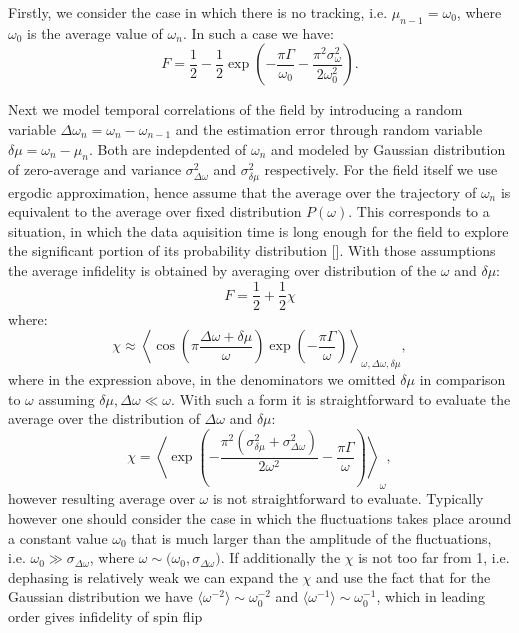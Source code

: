\documentclass[aps,twocolumn,pra,notitlepage,]{revtex4-2}
\begin{document}
Firstly, we consider the case in which there is no tracking, i.e. $\mu_{n-1} = \omega_0$, where $\omega_0$ is the average value of $\omega_n$. In such a case we have:
\begin{equation}
    F = \frac{1}{2} - \frac{1}{2} \exp\left(-\frac{\pi\Gamma}{\omega_0} - \frac{\pi^2 \sigma_\omega^2}{2\omega_0^2}\right).
\end{equation}

Next we model temporal correlations of the field by introducing a random variable $\Delta\omega_n = \omega_n - \omega_{n-1}$ and the estimation error through random variable $\delta \mu=\omega_n -\mu_n$. Both are indepdented of $\omega_n$ and modeled by Gaussian distribution of zero-average and variance $\sigma_{\Delta\omega}^2$ and $\sigma_{\delta\mu}^2$ respectively. For the field itself we use ergodic approximation, hence assume that the average over the trajectory of $\omega_n$ is equivalent to the average over fixed distribution $P(\omega)$. This corresponds to a situation, in which the data aquisition time is long enough for the field to explore the significant portion of its probability distribution []. With those assumptions the average infidelity is obtained by averaging over distribution of the $\omega$ and $\delta \mu$: 
\begin{equation}
    F  = \frac{1}{2} + \frac{1}{2} \chi
\end{equation}
where:
\begin{equation}
\chi \approx \left\langle \cos\left(\pi\frac{ \Delta \omega + \delta \mu}{\omega}\right)\exp(-\frac{\pi\Gamma}{\omega})  \right\rangle_{\omega, \Delta \omega, \delta \mu},
\end{equation}
where in the expression above, in the denominators we omitted $\delta \mu$ in comparison to $\omega$ assuming $\delta \mu, \Delta \omega \ll \omega$. With such a form it is straightforward to evaluate the average over the distribution of $\Delta \omega$ and $\delta \mu$:
\begin{equation}
    \chi = \left\langle \exp\left(-\frac{\pi^2(\sigma^2_{\delta \mu} + \sigma^2_{\Delta\omega})}{2\omega^2} - \frac{\pi\Gamma}{\omega} \right) \right\rangle_{\omega},
\end{equation}
however resulting average over $\omega$ is not straightforward to evaluate. Typically however one should consider the case in which the fluctuations takes place around a constant value $\omega_0$ that is much larger than the amplitude of the fluctuations, i.e. $\omega_0 \gg \sigma_{\Delta\omega}$, where $\omega \sim \mathcal(\omega_0, \sigma_{\Delta\omega})$. If additionally the $\chi$ is not too far from 1, i.e. dephasing is relatively weak we can expand the $\chi$ and use the fact that for the Gaussian distribution we have $\langle \omega^{-2} \rangle \sim \omega_0^{-2}$ and $\langle \omega^{-1} \rangle \sim \omega_0^{-1}$, which in leading order gives infidelity of spin flip
\end{document}
